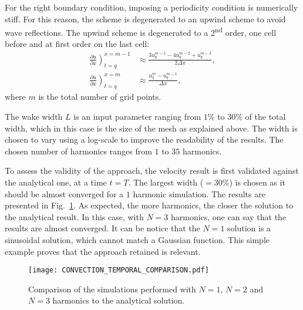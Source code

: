 For the right boundary condition, imposing a periodicity condition is
numerically stiff. For this reason, the scheme is degenerated 
to an upwind scheme to avoid wave reflections. The upwind scheme is degenerated to
a 2\textsuperscript{nd} order, one cell before and at first order on the 
last cell:
\begin{align}
    \left. \frac{\partial u}{\partial x} \right)_{t=q}^{x=m-1} &\approx 
    \frac{3 u^{m-1}_{q} - 4 u^{m-2}_{q} + u^{m-3}_{q}}{2\Delta x}, \\
    \left. \frac{\partial u}{\partial x} \right)_{t=q}^{x=m} &\approx 
    \frac{u^{m}_{q} - u^{m-1}_{q}}{\Delta x},
\label{eq:upwind_scheme}
\end{align}
where $m$ is the total number of grid points.

The wake width $L$ is an input parameter ranging
from $1\%$ to $30\%$ of the total width, which in this case
is the size of the mesh as explained above.
The width is chosen to vary using a log-scale 
to improve the readability of the results.
The chosen number of harmonics ranges from $1$ to $35$ harmonics.

To assess the validity of the approach, the velocity result is first
validated against the analytical one, at a time $t=T$. The largest width ($=30\%$)
is chosen as it should be almost converged for a $1$ harmonic simulation. The results
are presented in Fig.~\ref{fig:convection_temporal_comparison}. As expected,
the more harmonics, the closer the solution to the analytical result. In this case,
with $N=3$ harmonics, one can say that the results are almost converged. It can
be notice that the $N=1$ solution is a sinusoidal solution, which cannot match 
a Gaussian function. This simple example proves that the approach retained is relevant.
\begin{figure}[htbp]
  \begin{center}
    \texttt{[image: CONVECTION\_TEMPORAL\_COMPARISON.pdf]}
  \end{center}
  \caption{Comparison of the simulations performed with $N=1$, 
  $N=2$ and $N=3$ harmonics to the analytical solution.}
  \label{fig:convection_temporal_comparison}
\end{figure}


